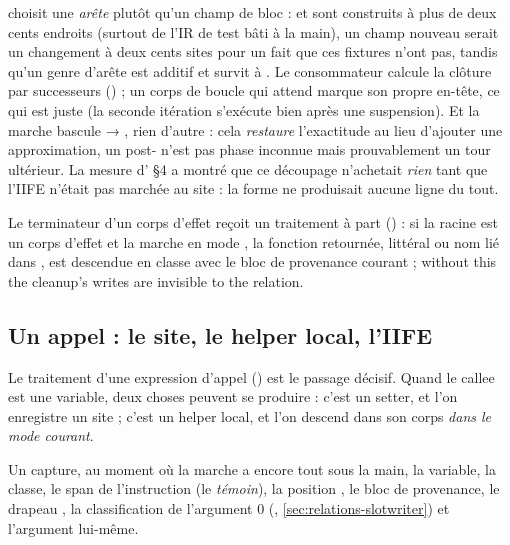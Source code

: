 \begin{decision}
 choisit une \emph{arête}  plutôt qu'un champ de bloc :  et  sont construits à plus de deux cents endroits (surtout de l'IR de test bâti à la main), un champ nouveau serait un changement à deux cents sites pour un fait que ces fixtures n'ont pas, tandis qu'un genre d'arête est additif et survit à . Le consommateur calcule la clôture  par successeurs () ; un corps de boucle qui attend marque son propre en-tête, ce qui est juste (la seconde itération s'exécute bien après une suspension). Et la marche bascule  → , rien d'autre : cela \emph{restaure} l'exactitude au lieu d'ajouter une approximation, un post- n'est pas \og phase inconnue\fg{} mais prouvablement un tour ultérieur. La mesure d' §4 a montré que ce découpage n'achetait \emph{rien} tant que l'IIFE n'était pas marchée au site : la forme  ne produisait aucune ligne du tout.
\end{decision}

Le terminateur  d'un corps d'effet reçoit un traitement à part () : si la racine est un corps d'effet et la marche en mode , la fonction retournée, littéral ou nom lié dans , est descendue en classe  avec le bloc de provenance courant ; \og without this the cleanup's writes are invisible to the relation\fg{}.

\subsection{Un appel : le site, le helper local, l'IIFE}

Le traitement d'une expression d'appel () est le passage décisif. Quand le callee est une variable, deux choses peuvent se produire : c'est un setter, et l'on enregistre un site ; c'est un helper local, et l'on descend dans son corps \emph{dans le mode courant}.


Un  capture, au moment où la marche a encore tout sous la main, la variable, la classe, le span de l'instruction (le \emph{témoin}), la position , le bloc de provenance, le drapeau , la classification de l'argument 0 (, \cref{sec:relations-slotwriter}) et l'argument lui-même.

